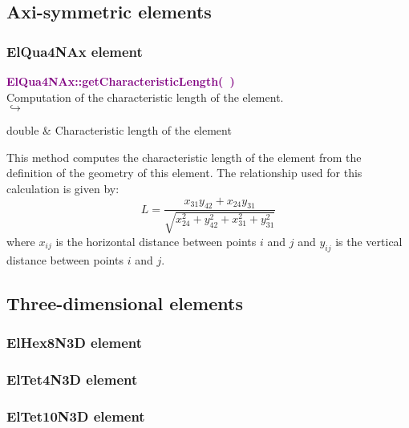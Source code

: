 \subsection{Axi-symmetric elements}

\subsubsection{ElQua4NAx element}

\textcolor{purple}{\textbf{ElQua4NAx::getCharacteristicLength(~)}}\label{ElQua4NAx::getCharacteristicLength()}\\
Computation of the characteristic length of the element.\\ \hspace*{5mm}$\hookrightarrow$
\vspace*{-2em}\begin{tcolorbox}[grow to left by=-1cm, width=\textwidth-1cm,myArgs,tabularx={l|R}]
double & Characteristic length of the element
\end{tcolorbox}

This method computes the characteristic length of the element from the definition of the geometry of this element.
The relationship used for this calculation is given by:
\begin{equation}
L=\frac{x_{31} y_{42}+x_{24} y_{31}}{\sqrt{x_{24}^2+y_{42}^2+x_{31}^2+y_{31}^2}}
\end{equation}
where $x_{ij}$ is the horizontal distance between points $i$ and $j$ and $y_{ij}$ is the vertical distance between points $i$ and $j$.

\subsection{Three-dimensional elements}

\subsubsection{ElHex8N3D element}

\subsubsection{ElTet4N3D element}

\subsubsection{ElTet10N3D element}
